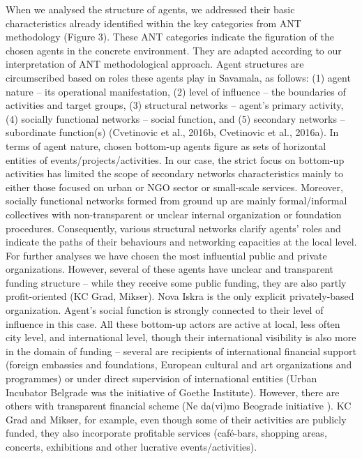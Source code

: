 \documentclass[11pt]{report}
\begin{document}
When we analysed the structure of agents, we addressed their basic characteristics already identified within the key categories from ANT methodology (Figure 3). These ANT categories indicate the figuration of the chosen agents in the concrete environment. They are adapted according to our interpretation of ANT methodological approach. Agent structures are circumscribed based on roles these agents play in Savamala, as follows: (1) agent nature – its operational manifestation, (2) level of influence – the boundaries of activities and target groups, (3) structural networks – agent’s primary activity, (4) socially functional networks – social function, and (5) secondary networks – subordinate function(s) (Cvetinovic et al., 2016b, Cvetinovic et al., 2016a). In terms of agent nature, chosen bottom-up agents figure as sets of horizontal entities of events/projects/activities. In our case, the strict focus on bottom-up activities has limited the scope of secondary networks characteristics mainly to either those focused on urban or NGO sector or small-scale services. Moreover, socially functional networks formed from ground up are mainly formal/informal collectives with non-transparent or unclear internal organization or foundation procedures. Consequently, various structural networks clarify agents’ roles and indicate the paths of their behaviours and networking capacities at the local level.
For further analyses we have chosen the most influential public and private organizations. However, several of these agents have unclear and transparent funding structure – while they receive some public funding, they are also partly profit-oriented (KC Grad, Mikser). Nova Iskra is the only explicit privately-based organization.  Agent’s social function is strongly connected to their level of influence in this case. All these bottom-up actors are active at local, less often city level, and international level, though their international visibility is also more in the domain of funding – several are recipients of international financial support (foreign embassies and foundations, European cultural and art organizations and programmes) or under direct supervision of international entities (Urban Incubator Belgrade was the initiative of Goethe Institute). However, there are others with transparent financial scheme (Ne da(vi)mo Beograde initiative ). KC Grad and Mikser, for example, even though some of their activities are publicly funded, they also incorporate profitable services (café-bars, shopping areas, concerts, exhibitions and other lucrative events/activities).
\end{document}
